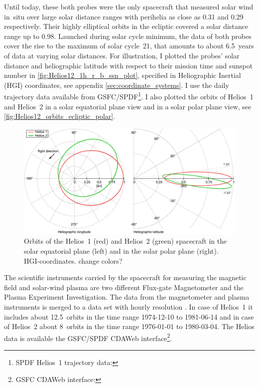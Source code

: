 Until today, these both probes were the only spacecraft that measured solar wind in~situ over large solar distance ranges with perihelia as close as \SI{0.31}{\au} and \SI{0.29}{\au} respectively. Their highly elliptical orbits in the ecliptic covered a solar distance range up to \SI{0.98}{\au}. Launched during solar cycle minimum, the data of both probes cover the rise to the maximum of solar cycle~21, that amounts to about 6.5~years of data at varying solar distances. For illustration, I plotted the probes' solar distance and heliographic latitude with respect to their mission time and sunspot number in \autoref{fig:Helios12_1h_r_b_ssn_plot}, specified in Heliographic Inertial (HGI) coordinates, see appendix \autoref{sec:coordinate_systems}. I use the daily trajectory data available from GSFC/SPDF\protect\footnote{SPDF Helios~1 trajectory data: }. I also plotted the orbits of Helios~1 and Helios~2 in a solar equatorial plane view and in a solar polar plane view, see \autoref{fig:Helios12_orbits_ecliptic_polar}.
\begin{figure}[htb]
	\centering
	\includegraphics[width=\textwidth]{figures_of_mine/gnuplots/Helios12_orbits_ecliptic_polar.pdf}
	\caption{Orbits of the Helios~1 (red) and Helios~2 (green) spacecraft in the solar equatorial plane (left) and in the solar polar plane (right). HGI-coordinates. change colors?}
	\label{fig:Helios12_orbits_ecliptic_polar}
\end{figure}

The scientific instruments carried by the spacecraft for measuring the magnetic field and solar-wind plasma are two different Flux-gate Magnetometer and the Plasma Experiment Investigation. The data from the magnetometer and plasma instruments is merged to a data set with hourly resolution \citep{Rosenbauer1977}. In case of Helios~1 it includes about 12.5~orbits in the time range \mbox{1974-12-10} to \mbox{1981-06-14} and in case of Helios~2 about 8~orbits in the time range \mbox{1976-01-01} to \mbox{1980-03-04}. The Helios data is available the GSFC/SPDF CDAWeb interface\footnote{GSFC CDAWeb interface: }.


